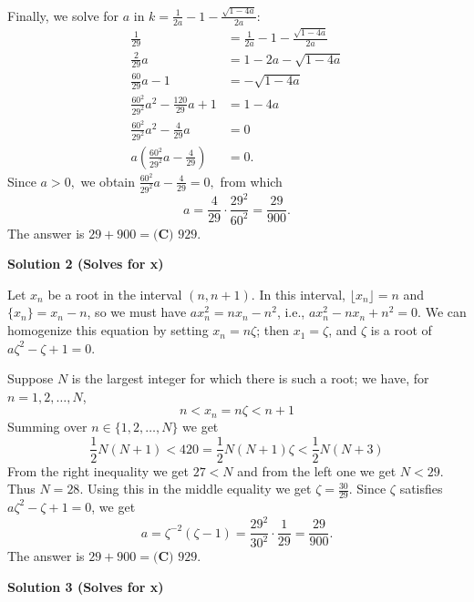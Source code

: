 \begin{enumerate}
 Finally, we solve for $a$ in $k=\frac{1}{2a}-1-\frac{\sqrt{1-4a}}{2a}:$
 \begin{align*} \frac{1}{29}&=\frac{1}{2a}-1-\frac{\sqrt{1-4a}}{2a} \\ \frac{2}{29}a&=1-2a-\sqrt{1-4a} \\ \frac{60}{29}a-1&=-\sqrt{1-4a} \\ \frac{60^2}{29^2}a^2-\frac{120}{29}a+1&=1-4a \\ \frac{60^2}{29^2}a^2-\frac{4}{29}a&=0 \\ a\left(\frac{60^2}{29^2}a-\frac{4}{29}\right)&=0. \end{align*}
Since $a>0,$ we obtain $\frac{60^2}{29^2}a-\frac{4}{29}=0,$ from which 
 \[a=\frac{4}{29}\cdot\frac{29^2}{60^2}=\frac{29}{900}.\]The answer is $29+900=\boxed{\textbf{(C) } 929}.$




\textbf{Solution 2 (Solves for x)}

Let $x_n$ be a root in the interval $(n,n+1)$. In this interval, $\lfloor x_n \rfloor = n$ and $\{x_n\}=x_n-n$, so we must have $ax_n^2 = nx_n-n^2$, i.e., $ax_n^2-nx_n+n^2=0$. We can homogenize this equation by setting $x_n=n\zeta$; then $x_1=\zeta$, and $\zeta$ is a root of $a\zeta^2-\zeta+1=0$. 

 Suppose $N$ is the largest integer for which there is such a root; we have, for $n=1,2,\ldots , N$, 
 \[n < x_n = n\zeta < n+1\] Summing over $n\in \{1,2,\ldots , N\}$ we get 
 \[\frac 12 N(N+1) < 420 = \frac 12 N(N+1)\zeta < \frac 12 N(N+3)\] From the right inequality we get $27< N$ and from the left one we get  $N<29$. Thus $N=28$. Using this in the middle equality we get $\zeta = \frac{30}{29}$. Since $\zeta$ satisfies $a\zeta^2-\zeta+1=0$, we get
 \[a = \zeta^{-2}(\zeta-1)= \frac{29^2}{30^2}\cdot \frac 1{29}= \frac{29}{900}.\]The answer is $29+900=\boxed{\textbf{(C) } 929}.$




\textbf{Solution 3 (Solves for x)}


\end{enumerate}
